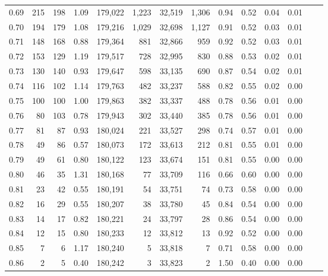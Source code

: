 \begin{tabular}{rrrrrrrrrrrrrr}
0.69 &    215 &  198 &    1.09 &  179,022 &    1,223 &  32,519 &   1,306 &  0.94 &  0.52 &  0.04 &      0.01 \\
0.70 &    194 &  179 &    1.08 &  179,216 &    1,029 &  32,698 &   1,127 &  0.91 &  0.52 &  0.03 &      0.01 \\
0.71 &    148 &  168 &    0.88 &  179,364 &      881 &  32,866 &     959 &  0.92 &  0.52 &  0.03 &      0.01 \\
0.72 &    153 &  129 &    1.19 &  179,517 &      728 &  32,995 &     830 &  0.88 &  0.53 &  0.02 &      0.01 \\
0.73 &    130 &  140 &    0.93 &  179,647 &      598 &  33,135 &     690 &  0.87 &  0.54 &  0.02 &      0.01 \\
0.74 &    116 &  102 &    1.14 &  179,763 &      482 &  33,237 &     588 &  0.82 &  0.55 &  0.02 &      0.00 \\
0.75 &    100 &  100 &    1.00 &  179,863 &      382 &  33,337 &     488 &  0.78 &  0.56 &  0.01 &      0.00 \\
0.76 &     80 &  103 &    0.78 &  179,943 &      302 &  33,440 &     385 &  0.78 &  0.56 &  0.01 &      0.00 \\
0.77 &     81 &   87 &    0.93 &  180,024 &      221 &  33,527 &     298 &  0.74 &  0.57 &  0.01 &      0.00 \\
0.78 &     49 &   86 &    0.57 &  180,073 &      172 &  33,613 &     212 &  0.81 &  0.55 &  0.01 &      0.00 \\
0.79 &     49 &   61 &    0.80 &  180,122 &      123 &  33,674 &     151 &  0.81 &  0.55 &  0.00 &      0.00 \\
0.80 &     46 &   35 &    1.31 &  180,168 &       77 &  33,709 &     116 &  0.66 &  0.60 &  0.00 &      0.00 \\
0.81 &     23 &   42 &    0.55 &  180,191 &       54 &  33,751 &      74 &  0.73 &  0.58 &  0.00 &      0.00 \\
0.82 &     16 &   29 &    0.55 &  180,207 &       38 &  33,780 &      45 &  0.84 &  0.54 &  0.00 &      0.00 \\
0.83 &     14 &   17 &    0.82 &  180,221 &       24 &  33,797 &      28 &  0.86 &  0.54 &  0.00 &      0.00 \\
0.84 &     12 &   15 &    0.80 &  180,233 &       12 &  33,812 &      13 &  0.92 &  0.52 &  0.00 &      0.00 \\
0.85 &      7 &    6 &    1.17 &  180,240 &        5 &  33,818 &       7 &  0.71 &  0.58 &  0.00 &      0.00 \\
0.86 &      2 &    5 &    0.40 &  180,242 &        3 &  33,823 &       2 &  1.50 &  0.40 &  0.00 &      0.00 \\

\end{tabular}
